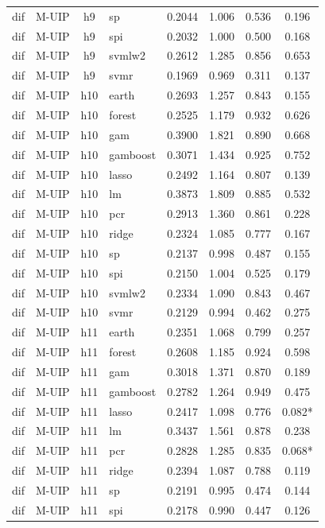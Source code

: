 \begin{ThreePartTable}
\begin{longtable}[t]{llclcccc}
dif & M-UIP & h9 & sp & 0.2044 & 1.006 & 0.536 & 0.196\\
dif & M-UIP & h9 & spi & 0.2032 & 1.000 & 0.500 & 0.168\\
dif & M-UIP & h9 & svmlw2 & 0.2612 & 1.285 & 0.856 & 0.653\\
dif & M-UIP & h9 & svmr & 0.1969 & 0.969 & 0.311 & 0.137\\
\addlinespace
dif & M-UIP & h10 & earth & 0.2693 & 1.257 & 0.843 & 0.155\\
dif & M-UIP & h10 & forest & 0.2525 & 1.179 & 0.932 & 0.626\\
dif & M-UIP & h10 & gam & 0.3900 & 1.821 & 0.890 & 0.668\\
dif & M-UIP & h10 & gamboost & 0.3071 & 1.434 & 0.925 & 0.752\\
dif & M-UIP & h10 & lasso & 0.2492 & 1.164 & 0.807 & 0.139\\
dif & M-UIP & h10 & lm & 0.3873 & 1.809 & 0.885 & 0.532\\
dif & M-UIP & h10 & pcr & 0.2913 & 1.360 & 0.861 & 0.228\\
dif & M-UIP & h10 & ridge & 0.2324 & 1.085 & 0.777 & 0.167\\
dif & M-UIP & h10 & sp & 0.2137 & 0.998 & 0.487 & 0.155\\
dif & M-UIP & h10 & spi & 0.2150 & 1.004 & 0.525 & 0.179\\
dif & M-UIP & h10 & svmlw2 & 0.2334 & 1.090 & 0.843 & 0.467\\
dif & M-UIP & h10 & svmr & 0.2129 & 0.994 & 0.462 & 0.275\\
\addlinespace
dif & M-UIP & h11 & earth & 0.2351 & 1.068 & 0.799 & 0.257\\
dif & M-UIP & h11 & forest & 0.2608 & 1.185 & 0.924 & 0.598\\
dif & M-UIP & h11 & gam & 0.3018 & 1.371 & 0.870 & 0.189\\
dif & M-UIP & h11 & gamboost & 0.2782 & 1.264 & 0.949 & 0.475\\
dif & M-UIP & h11 & lasso & 0.2417 & 1.098 & 0.776 & 0.082*\\
dif & M-UIP & h11 & lm & 0.3437 & 1.561 & 0.878 & 0.238\\
dif & M-UIP & h11 & pcr & 0.2828 & 1.285 & 0.835 & 0.068*\\
dif & M-UIP & h11 & ridge & 0.2394 & 1.087 & 0.788 & 0.119\\
dif & M-UIP & h11 & sp & 0.2191 & 0.995 & 0.474 & 0.144\\
dif & M-UIP & h11 & spi & 0.2178 & 0.990 & 0.447 & 0.126\\

\end{longtable}
\end{ThreePartTable}
